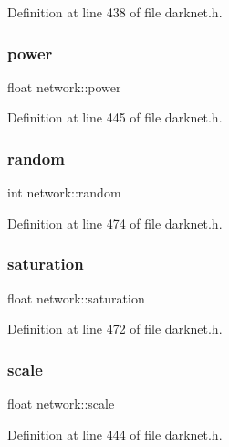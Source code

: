 Definition at line 438 of file darknet.\+h.

\mbox{\label{structnetwork_ae38f864b7b9966c38f1882f468131eda}} 
\subsubsection{\texorpdfstring{power}{power}}
{\footnotesize\ttfamily float network\+::power}



Definition at line 445 of file darknet.\+h.

\mbox{\label{structnetwork_a89dfdaa6178f338c250d7b6631476fa1}} 
\subsubsection{\texorpdfstring{random}{random}}
{\footnotesize\ttfamily int network\+::random}



Definition at line 474 of file darknet.\+h.

\mbox{\label{structnetwork_a9bbb55144a6eca464fbc122f97bf1af8}} 
\subsubsection{\texorpdfstring{saturation}{saturation}}
{\footnotesize\ttfamily float network\+::saturation}



Definition at line 472 of file darknet.\+h.

\mbox{\label{structnetwork_a0d9e7af8dde42e28a7fdb0e685b2f23b}} 
\subsubsection{\texorpdfstring{scale}{scale}}
{\footnotesize\ttfamily float network\+::scale}



Definition at line 444 of file darknet.\+h.

